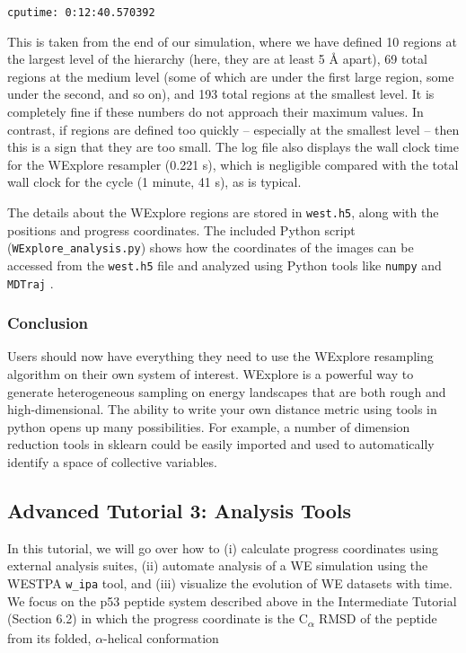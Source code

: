 \documentclass[9pt,tutorial]{livecoms}
\begin{document}
\verb|cputime: 0:12:40.570392|

This is taken from the end of our simulation, where we have defined 10 regions at the largest level of the hierarchy (here, they are at least 5 \AA{} apart), 69 total regions at the medium level (some of which are under the first large region, some under the second, and so on), and 193 total regions at the smallest level. 
It is completely fine if these numbers do not approach their maximum values. 
In contrast, if regions are defined too quickly – especially at the smallest level – then this is a sign that they are too small.  
The log file also displays the wall clock time for the WExplore resampler (0.221 s), which is negligible compared with the total wall clock for the cycle (1 minute, 41 s), as is typical.

The details about the WExplore regions are stored in \verb|west.h5|, along with the positions and progress coordinates. 
The included Python script (\verb|WExplore_analysis.py|) shows how the coordinates of the images can be accessed from the \verb|west.h5| file and analyzed using Python tools like \verb|numpy| and \verb|MDTraj| \citep{mdt2015}.

\subsubsection{Conclusion}

Users should now have everything they need to use the WExplore resampling algorithm on their own system of interest.  
WExplore is a powerful way to generate heterogeneous sampling on energy landscapes that are both rough and high-dimensional. 
The ability to write your own distance metric using tools in python opens up many possibilities. 
For example, a number of dimension reduction tools in sklearn could be easily imported and used to automatically identify a space of collective variables.  

\subsection{Advanced Tutorial 3: Analysis Tools}

In this tutorial, we will go over how to (i) calculate progress coordinates using external analysis suites, (ii) automate analysis of a WE simulation using the WESTPA \verb|w_ipa| tool, and (iii) visualize the evolution of WE datasets with time. 
We focus on the p53 peptide system described above in the Intermediate Tutorial (Section 6.2) in which the progress coordinate is the C\textsubscript{$\alpha$} RMSD of the peptide from its folded, $\alpha$-helical conformation
\end{document}
